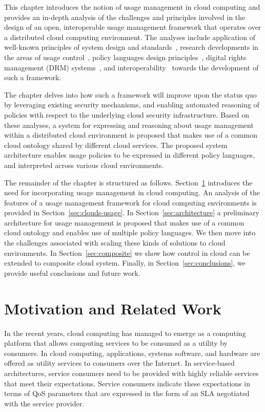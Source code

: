 \documentclass[notitlepage]{book}
\begin{document}
\begin{doublespace}
This chapter introduces the notion of usage management in cloud computing and provides an in-depth analysis of the challenges and principles involved in the design of an open, interoperable usage management framework that operates over a distributed cloud computing environment. The analyses include application of well-known principles of system design and standards~\cite{BlCl:01,Cl:88,ClWrSoBr:02}, research developments in the areas of usage control~\cite{JaHeLa:10,PaSa:04}, policy languages design principles~\cite{JaHeMa:06}, digital rights management (DRM) systems~\cite{JaHe:09},  and interoperability~\cite{HeJa:05,JaHe:04,KoLaMaMi:04} towards the development of such a framework.

The chapter delves into how such a framework will improve upon the status quo by leveraging  existing security mechanisms, and enabling automated reasoning of policies with respect to the underlying cloud security infrastructure. Based on these analyses, a system for expressing and reasoning about usage management within a distributed cloud environment is proposed that makes use of a common cloud ontology shared by different cloud services. The proposed system architecture enables usage policies to be expressed in different policy languages, and interpreted across various cloud environments. 

The remainder of the chapter is structured as follows. Section~\ref{sec:motivation} introduces the need for incorporating usage management in cloud computing. An analysis of the features of a usage management framework for cloud computing environments is provided in Section~\ref{sec:clouds-usage}. In Section~\ref{sec:architecture} a preliminary architecture for usage management is proposed that makes use of a common cloud ontology and enables use of multiple policy languages. We then move into the challenges associated with scaling these kinds of solutions to cloud environments. In Section~\ref{sec:composite} we show how control in cloud can be extended to composite cloud system. Finally, in Section~\ref{sec:conclusions}, we provide useful conclusions and future work. 

\section{Motivation and Related Work}\label{sec:motivation}
In the recent years, cloud computing has  managed to emerge as a computing platform that allows computing services to be consumed as a utility by consumers. In cloud computing, applications, systems software, and hardware are offered as utility services to consumers over the Internet. In service-based architectures, service consumers need to be provided with  highly reliable services that meet their expectations. Service consumers indicate these expectations in terms of QoS parameters that are expressed in the form of an SLA negotiated with the service provider. 


\end{doublespace}
\end{document}
